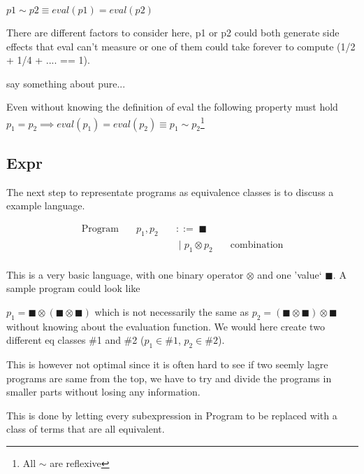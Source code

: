 $p1 \sim p2 \equiv eval(p1) = eval(p2)$

There are different factors to consider here, p1 or p2 could both generate side effects that eval can't measure or one of them could take forever to compute (1/2 + 1/4 + .... == 1).

say something about pure...

Even without knowing the definition of eval the following property must hold
$p_1 = p_2 \implies eval(p_1) = eval(p_2) \equiv p_1 \sim p_2$\footnote{All $\sim$ are reflexive}



\subsection{Expr}

The next step to representate programs as equivalence classes is to discuss a example language. 

\begin{equation*}
\begin{aligned}
\text{Program} \quad & p_1,p_2 \quad & ::= \; \blacksquare \\
 & & \; | \; p_1 \otimes p_2  & \quad \text{combination} \\
\end{aligned}
\end{equation*}

This is a very basic language, with one binary operator $\otimes$ and one 'value` $\blacksquare$. A sample program could look like

$p_1 = \blacksquare \otimes (\blacksquare \otimes \blacksquare)$
which is not necessarily the same as 
$p_2 = (\blacksquare \otimes \blacksquare) \otimes \blacksquare$
without knowing about the evaluation function. 
We would here create two different eq classes \#1 and \#2 ($p_1 \in \#1$, $p_2 \in \#2$).

This is however not optimal since it is often hard to see if two seemly lagre programs are same from the top, we have to try and divide the programs in smaller parts without losing any information.

This is done by letting every subexpression in Program to be replaced with a class of terms that are all equivalent.

